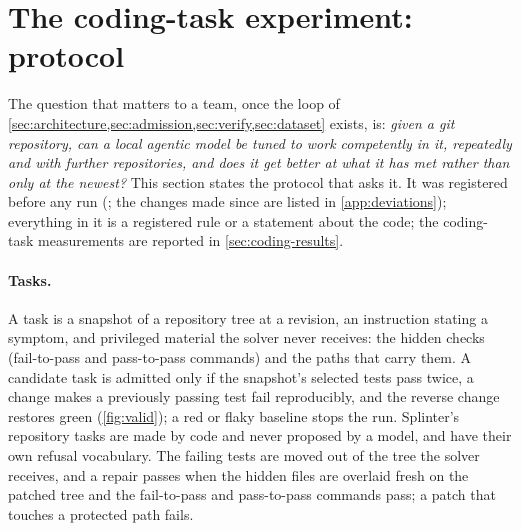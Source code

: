
\section{The coding-task experiment: protocol}\label{sec:protocol}\label{app:coding}

The question that matters to a team, once the loop of
\cref{sec:architecture,sec:admission,sec:verify,sec:dataset} exists, is:
\emph{given a git repository, can a local agentic model be tuned to work competently in
it, repeatedly and with further repositories, and does it get better at what it has met
rather than only at the newest?} This section states the protocol that asks it. It was
registered before any run (; the changes made since are listed in \cref{app:deviations}); everything
in it is a registered rule or a statement about the code; the coding-task measurements are
reported in \cref{sec:coding-results}.

\paragraph{Tasks.} A task is a snapshot of a repository tree at a revision, an
instruction stating a symptom, and privileged material the solver never receives: the
hidden checks (fail-to-pass and pass-to-pass commands) and the paths that carry them.
A candidate task is admitted only if the snapshot's selected tests pass twice, a change makes
a previously passing test fail reproducibly, and the reverse change restores green
(\cref{fig:valid}); a red or flaky baseline stops the run. Splinter's repository
tasks are made by code and never proposed by a model, and have their own refusal
vocabulary. The failing tests are moved out of the tree the solver receives, and a
repair passes when the hidden files are overlaid fresh on the patched tree and the
fail-to-pass and pass-to-pass commands pass; a patch that touches a protected path
fails.

